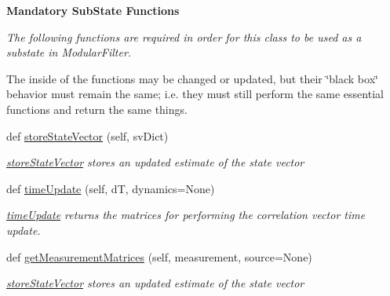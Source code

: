 \begin{Indent}{\bf Mandatory Sub\+State Functions}\par
{\em The following functions are required in order for this class to be used as a substate in Modular\+Filter.

The inside of the functions may be changed or updated, but their \char`\"{}black box\char`\"{} behavior must remain the same; i.\+e. they must still perform the same essential functions and return the same things. }\begin{DoxyCompactItemize}
\item 
def \hyperlink{classmodest_1_1substates_1_1correlationvector_1_1CorrelationVector_a70ed47697f09424e62e52133fdfb59de}{store\+State\+Vector} (self, sv\+Dict)
\begin{DoxyCompactList}\small\item\em \hyperlink{classmodest_1_1substates_1_1correlationvector_1_1CorrelationVector_a70ed47697f09424e62e52133fdfb59de}{store\+State\+Vector} stores an updated estimate of the state vector \end{DoxyCompactList}\item 
def \hyperlink{classmodest_1_1substates_1_1correlationvector_1_1CorrelationVector_a59c13e5fa26ba27717494f687ec78ef8}{time\+Update} (self, dT, dynamics=None)
\begin{DoxyCompactList}\small\item\em \hyperlink{classmodest_1_1substates_1_1correlationvector_1_1CorrelationVector_a59c13e5fa26ba27717494f687ec78ef8}{time\+Update} returns the matrices for performing the correlation vector time update. \end{DoxyCompactList}\item 
def \hyperlink{classmodest_1_1substates_1_1correlationvector_1_1CorrelationVector_a2fb13d8c6fffa49ee641dd918a64db4b}{get\+Measurement\+Matrices} (self, measurement, source=None)
\begin{DoxyCompactList}\small\item\em \hyperlink{classmodest_1_1substates_1_1correlationvector_1_1CorrelationVector_a70ed47697f09424e62e52133fdfb59de}{store\+State\+Vector} stores an updated estimate of the state vector \end{DoxyCompactList}\end{DoxyCompactItemize}
\end{Indent}
